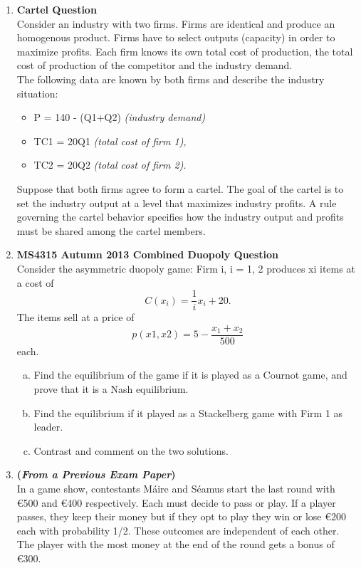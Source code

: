 \documentclass[]{report}
\begin{document}
\begin{enumerate}
\begin{itemize}
\end{itemize}
\item \textbf{Cartel Question}\\
Consider an industry with two firms. Firms are identical and produce an
homogenous product. Firms have to select outputs (capacity) in order to maximize
profits. Each firm knows its own total cost of production, the total cost of production of
the competitor and the industry demand.
\\
The following data are known by both firms and describe the industry
situation:
\begin{itemize}
\item P = 140 - (Q1+Q2) \textit{(industry demand)}
\item TC1 = 20Q1 \textit{(total cost of firm 1),}
\item TC2 = 20Q2 \textit{(total cost of firm 2).}
\end{itemize}
Suppose that both firms agree to form a cartel. The goal of the cartel is to set the
industry output at a level that maximizes industry profits. A rule governing the cartel
behavior specifies how the industry output and profits must be shared among the cartel
members.
\item \textbf{MS4315 Autumn 2013 Combined Duopoly Question}\\
Consider the asymmetric duopoly game: Firm i, i = 1, 2 produces xi
items
at a cost of
\[C(x_i) = \frac{1}{i}x_i + 20.\]
The items sell at a price of
\[p(x1, x2) = 5 − \frac{x_1+x_2}{500}\]
each.
\begin{enumerate}[(a)]
	\item Find the equilibrium of the game if it is played as a Cournot game,
	and prove that it is a Nash equilibrium. 
	\item Find the equilibrium if it played as a Stackelberg game with Firm 1 as
	leader. 
	\item Contrast and comment on the two solutions. 
\end{enumerate}


\item \textbf{(\textit{From a Previous Exam Paper})} \\ In a game show, contestants M\'{a}ire and S\'{e}amus start the last round with \euro{500} and \euro{400} respectively. Each must decide to pass or play. If a player passes, they keep their money but if they opt to play they win or lose \euro{200} each with probability 1/2. These outcomes are independent of each other. The player with the most money at the end of the round gets a bonus of \euro{300}.


\end{enumerate}
\end{document}
